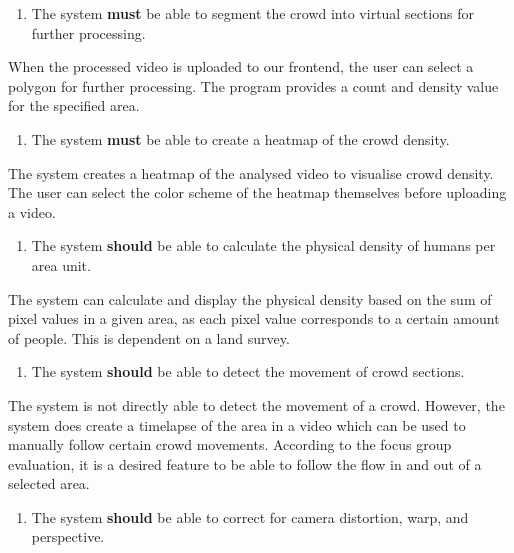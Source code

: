 \documentclass[
]{article}
\providecommand{\tightlist}{%
  \setlength{\itemsep}{0pt}\setlength{\parskip}{0pt}}\usepackage{longtable,booktabs,array}
\begin{document}
\begin{enumerate}
\def\labelenumi{\arabic{enumi}.}
\setcounter{enumi}{1}
\tightlist
\item
  The system \textbf{must} be able to segment the crowd into virtual
  sections for further processing.
\end{enumerate}

When the processed video is uploaded to our frontend, the user can
select a polygon for further processing. The program provides a count
and density value for the specified area.

\begin{enumerate}
\def\labelenumi{\arabic{enumi}.}
\setcounter{enumi}{2}
\tightlist
\item
  The system \textbf{must} be able to create a heatmap of the crowd
  density.
\end{enumerate}

The system creates a heatmap of the analysed video to visualise crowd
density. The user can select the color scheme of the heatmap themselves
before uploading a video.

\begin{enumerate}
\def\labelenumi{\arabic{enumi}.}
\setcounter{enumi}{3}
\tightlist
\item
  The system \textbf{should} be able to calculate the physical density
  of humans per area unit.
\end{enumerate}

The system can calculate and display the physical density based on the
sum of pixel values in a given area, as each pixel value corresponds to
a certain amount of people. This is dependent on a land survey.

\begin{enumerate}
\def\labelenumi{\arabic{enumi}.}
\setcounter{enumi}{4}
\tightlist
\item
  The system \textbf{should} be able to detect the movement of crowd
  sections.
\end{enumerate}

The system is not directly able to detect the movement of a crowd.
However, the system does create a timelapse of the area in a video which
can be used to manually follow certain crowd movements. According to the
focus group evaluation, it is a desired feature to be able to follow the
flow in and out of a selected area.

\begin{enumerate}
\def\labelenumi{\arabic{enumi}.}
\setcounter{enumi}{5}
\tightlist
\item
  The system \textbf{should} be able to correct for camera distortion,
  warp, and perspective.
\end{enumerate}
\end{document}
